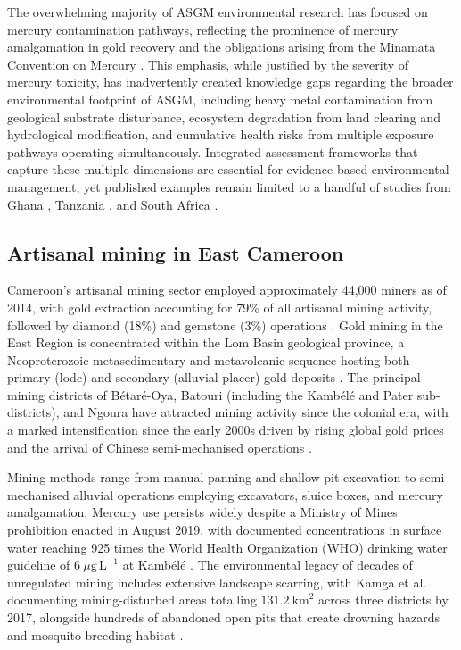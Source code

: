\documentclass[preprint,12pt,number]{elsarticle}
\begin{document}
The overwhelming majority of ASGM environmental research has focused on mercury contamination pathways, reflecting the prominence of mercury amalgamation in gold recovery and the obligations arising from the Minamata Convention on Mercury \cite{UNEP2020}. This emphasis, while justified by the severity of mercury toxicity, has inadvertently created knowledge gaps regarding the broader environmental footprint of ASGM, including heavy metal contamination from geological substrate disturbance, ecosystem degradation from land clearing and hydrological modification, and cumulative health risks from multiple exposure pathways operating simultaneously. Integrated assessment frameworks that capture these multiple dimensions are essential for evidence-based environmental management, yet published examples remain limited to a handful of studies from Ghana \cite{Basu2015, Hilson2002}, Tanzania \cite{Malisa2009}, and South Africa \cite{Kamunda2016}.

\subsection{Artisanal mining in East Cameroon}

Cameroon's artisanal mining sector employed approximately 44,000 miners as of 2014, with gold extraction accounting for 79\% of all artisanal mining activity, followed by diamond (18\%) and gemstone (3\%) operations \cite{CAPAM2014}. Gold mining in the East Region is concentrated within the Lom Basin geological province, a Neoproterozoic metasedimentary and metavolcanic sequence hosting both primary (lode) and secondary (alluvial placer) gold deposits \cite{Mimba2018}. The principal mining districts of B\'{e}tar\'{e}-Oya, Batouri (including the Kamb\'{e}l\'{e} and Pater sub-districts), and Ngoura have attracted mining activity since the colonial era, with a marked intensification since the early 2000s driven by rising global gold prices and the arrival of Chinese semi-mechanised operations \cite{Weng2022}.

Mining methods range from manual panning and shallow pit excavation to semi-mechanised alluvial operations employing excavators, sluice boxes, and mercury amalgamation. Mercury use persists widely despite a Ministry of Mines prohibition enacted in August 2019, with documented concentrations in surface water reaching 925 times the World Health Organization (WHO) drinking water guideline of $6~\mu\text{g}\,\text{L}^{-1}$ at Kamb\'{e}l\'{e} \cite{Fonshiynwa2024}. The environmental legacy of decades of unregulated mining includes extensive landscape scarring, with Kamga et al. \cite{Kamga2020} documenting mining-disturbed areas totalling $131.2~\text{km}^{2}$ across three districts by 2017, alongside hundreds of abandoned open pits that create drowning hazards and mosquito breeding habitat \cite{FODER2022}.
\end{document}
